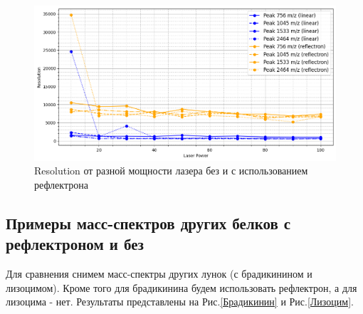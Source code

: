 \documentclass{article}
\begin{document}
\begin{figure}[h!]
\centering
    \includegraphics[width=1\linewidth]{Images/Pes(power) lin-ref.png}
    \caption{Resolution от разной мощности лазера без и с использованием рефлектрона}
    \label{Re - reflecton vs linear}
\end{figure}

\subsection{Примеры масс-спектров других белков с рефлектроном и без}\;
\par Для сравнения снимем масс-спектры других лунок (с брадикинином и лизоцимом). Кроме того для брадикинина будем использовать рефлектрон, а для лизоцима - нет. Результаты представлены на Рис.\ref{Брадикинин} и Рис.\ref{Лизоцим}. 
\end{document}
